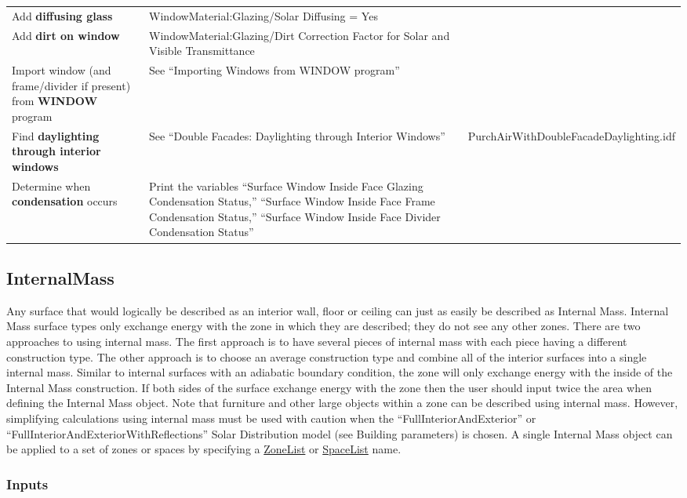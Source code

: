 \begin{longtable}[c]{p{2.0in}p{2.0in}p{2.0in}}
Add \textbf{diffusing glass} & Window\-Material:\-Glazing/\-Solar Diffusing = Yes & \tabularnewline
Add \textbf{dirt on window} & Window\-Material:\-Glazing/\-Dirt Correction Factor for Solar and Visible Transmittance & \tabularnewline
Import window (and frame/divider if present) from \textbf{WINDOW} program & See ``Importing Windows from WINDOW program'' & \tabularnewline
Find \textbf{daylighting through interior windows} & See ``Double Facades: Daylighting through Interior Windows'' & Purch\-Air\-With\-Double\-Facade\-Daylighting.idf \tabularnewline
Determine when \textbf{condensation} occurs & Print the variables ``Surface Window Inside Face Glazing Condensation Status,'' ``Surface Window Inside Face Frame Condensation Status,'' ``Surface Window Inside Face Divider Condensation Status'' & \tabularnewline
\bottomrule
\end{longtable}

\subsection{InternalMass}\label{internalmass}

Any surface that would logically be described as an interior wall, floor or ceiling can just as easily be described as Internal Mass. Internal Mass surface types only exchange energy with the zone in which they are described; they do not see any other zones. There are two approaches to using internal mass. The first approach is to have several pieces of internal mass with each piece having a different construction type. The other approach is to choose an average construction type and combine all of the interior surfaces into a single internal mass. Similar to internal surfaces with an adiabatic boundary condition, the zone will only exchange energy with the inside of the Internal Mass construction. If both sides of the surface exchange energy with the zone then the user should input twice the area when defining the Internal Mass object. Note that furniture and other large objects within a zone can be described using internal mass. However, simplifying calculations using internal mass must be used with caution when the ``FullInteriorAndExterior'' or ``FullInteriorAndExteriorWithReflections'' Solar Distribution model (see Building parameters) is chosen. A single Internal Mass object can be applied to a set of zones or spaces by specifying a \hyperref[zonelist]{ZoneList} or \hyperref[spacelist]{SpaceList} name.

\subsubsection{Inputs}\label{inputs-25-004}

